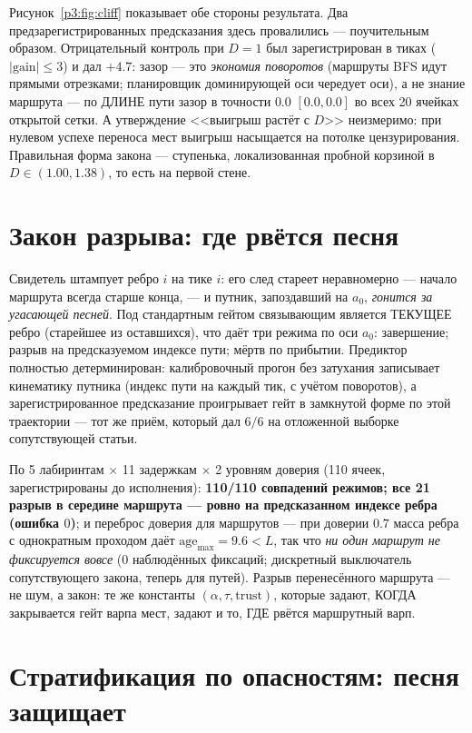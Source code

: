 \documentclass{article}
\begin{document}
Рисунок~\ref{p3:fig:cliff} показывает обе стороны результата.
Два предзарегистрированных предсказания здесь провалились ---
поучительным образом. Отрицательный контроль при $D{=}1$ был
зарегистрирован в тиках ($|\text{gain}|\le 3$) и дал $+4.7$: зазор ---
это \emph{экономия поворотов} (маршруты BFS идут прямыми отрезками;
планировщик доминирующей оси чередует оси), а не знание маршрута ---
по ДЛИНЕ пути зазор в точности $0.0$ $[0.0,0.0]$ во всех 20 ячейках
открытой сетки. А утверждение <<выигрыш растёт с $D$>> неизмеримо: при
нулевом успехе переноса мест выигрыш насыщается на потолке
цензурирования. Правильная форма закона --- ступенька, локализованная
пробной корзиной в $D\in(1.00,1.38)$, то есть на первой стене.

\section{Закон разрыва: где рвётся песня}
\label{p3:sec:rupture}

Свидетель штампует ребро $i$ на тике $i$: его след стареет
неравномерно --- начало маршрута всегда старше конца, --- и путник,
запоздавший на $a_0$, \emph{гонится за угасающей песней}. Под
стандартным гейтом связывающим является ТЕКУЩЕЕ ребро (старейшее из
оставшихся), что даёт три режима по оси $a_0$: завершение; разрыв на
предсказуемом индексе пути; мёртв по прибытии. Предиктор полностью
детерминирован: калибровочный прогон без затухания записывает
кинематику путника (индекс пути на каждый тик, с учётом поворотов), а
зарегистрированное предсказание проигрывает гейт в замкнутой форме по
этой траектории --- тот же приём, который дал $6/6$ на отложенной
выборке сопутствующей статьи.

По 5 лабиринтам $\times$ 11 задержкам $\times$ 2 уровням доверия (110
ячеек, зарегистрированы до исполнения): \textbf{110/110 совпадений
режимов; все 21 разрыв в середине маршрута --- ровно на предсказанном
индексе ребра (ошибка $0$)}; и переброс доверия для маршрутов --- при
доверии $0.7$ масса ребра с однократным проходом даёт
$\mathrm{age}_{\max} = 9.6 < L$, так что \emph{ни один маршрут не
фиксируется вовсе} ($0$ наблюдённых фиксаций; дискретный выключатель
сопутствующего закона, теперь для путей). Разрыв перенесённого
маршрута --- не шум, а закон: те же константы
$(\alpha,\tau,\text{trust})$, которые задают, КОГДА закрывается гейт
варпа мест, задают и то, ГДЕ рвётся маршрутный варп.

\section{Стратификация по опасностям: песня защищает}
\label{p3:sec:hazard}
\end{document}
